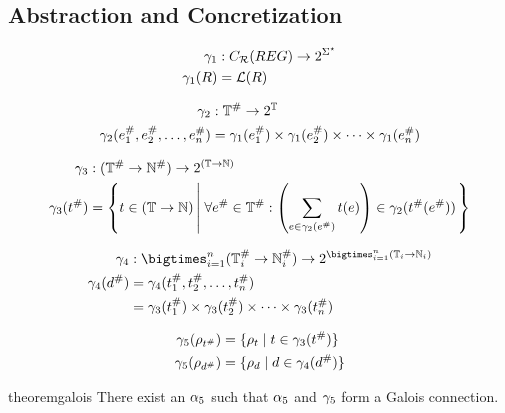 \subsection{Abstraction and Concretization}\label{subsec:abstraction-and-concretization}

\begin{align}
    \gamma_1 &: C_{\mathcal{R}}(REG) \rightarrow 2^{\Sigma^\star} \\
    \gamma_1(R) &= \mathcal{L}(R)
\end{align}

\begin{align}
    \gamma_2 &: \mathbb{T}^\# \rightarrow 2^\mathbb{T} \\
    \gamma_2 (e_1^\#, e_2^\#, \dots, e_n^\#) &= \gamma_1(e_1^\#) \times \gamma_1(e_2^\#) \times \dots \times \gamma_1(e_n^\#)
\end{align}

\begin{align}
    \gamma_3 &: (\mathbb{T}^\# \rightarrow \mathbb{N}^\#) \rightarrow 2^{(\mathbb{T} \rightarrow \mathbb{N})} \\
    \gamma_3 (t^\#) &= \left\{ t \in (\mathbb{T} \rightarrow \mathbb{N}) \left|\; \forall e^\# \in \mathbb{T}^\# : \left( \sum_{e \in \gamma_2(e^\#)} t(e) \right) \in \gamma_2(t^\#(e^\#))\right. \right\}
\end{align}

\begin{align}
    \concrete_4 &: \bigtimes_{i = 1}^{n} (\mathbb{T}^\#_i \rightarrow \mathbb{N}^\#_i) \rightarrow 2^{\bigtimes_{i = 1}^{n} (\mathbb{T}_i \rightarrow \mathbb{N}_i)} \\
    \concrete_4(d^\#) &= \concrete_4(t_1^\#, t_2^\#, \dots, t_n^\#) \\
                    &= \concrete_3(t_1^\#) \times \concrete_3(t_2^\#) \times \dots \times \concrete_3(t_n^\#)
\end{align}

\begin{align}
    \gamma_5(\rho_{t^\#}) &= \{ \rho_{t} \mid t \in \gamma_3(t^\#) \} \\
    \gamma_5(\rho_{d^\#}) &= \{ \rho_{d} \mid d \in \gamma_4(d^\#) \}
\end{align}

\begin{restatable}{theorem}{galois}\label{thm:galios}
    There exist an $\alpha_5$ such that $\alpha_5$ and $\gamma_5$ form a Galois connection.
\end{restatable}
